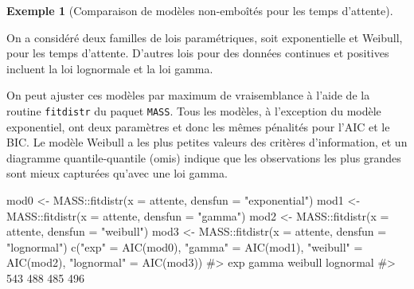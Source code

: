 \documentclass[
  11pt,
  letterpaper,
]{scrbook}
\newenvironment{Shaded}{\begin{snugshade}}{\end{snugshade}}
\newcommand{\AttributeTok}[1]{\textcolor[rgb]{0.40,0.45,0.13}{#1}}
\newcommand{\CommentTok}[1]{\textcolor[rgb]{0.37,0.37,0.37}{#1}}
\newcommand{\FunctionTok}[1]{\textcolor[rgb]{0.28,0.35,0.67}{#1}}
\newcommand{\NormalTok}[1]{\textcolor[rgb]{0.00,0.23,0.31}{#1}}
\newcommand{\OtherTok}[1]{\textcolor[rgb]{0.00,0.23,0.31}{#1}}
\newcommand{\SpecialCharTok}[1]{\textcolor[rgb]{0.37,0.37,0.37}{#1}}
\newcommand{\StringTok}[1]{\textcolor[rgb]{0.13,0.47,0.30}{#1}}
\theoremstyle{definition}
\theoremstyle{plain}
\theoremstyle{definition}
\newtheorem{example}{Exemple}[chapter]
\theoremstyle{plain}
\theoremstyle{remark}
\begin{document}
\begin{example}[Comparaison de modèles non-emboîtés pour les temps
d'attente]\protect\hypertarget{exm-aic}{}\label{exm-aic}

On a considéré deux familles de lois paramétriques, soit exponentielle
et Weibull, pour les temps d'attente. D'autres lois pour des données
continues et positives incluent la loi lognormale et la loi gamma.

On peut ajuster ces modèles par maximum de vraisemblance à l'aide de la
routine \texttt{fitdistr} du paquet \texttt{MASS}. Tous les modèles, à
l'exception du modèle exponentiel, ont deux paramètres et donc les mêmes
pénalités pour l'AIC et le BIC. Le modèle Weibull a les plus petites
valeurs des critères d'information, et un diagramme quantile-quantile
(omis) indique que les observations les plus grandes sont mieux
capturées qu'avec une loi gamma.

\begin{Shaded}
\begin{Highlighting}[]
\NormalTok{mod0 }\OtherTok{\textless{}{-}}\NormalTok{ MASS}\SpecialCharTok{::}\FunctionTok{fitdistr}\NormalTok{(}\AttributeTok{x =}\NormalTok{ attente, }\AttributeTok{densfun =} \StringTok{"exponential"}\NormalTok{)}
\NormalTok{mod1 }\OtherTok{\textless{}{-}}\NormalTok{ MASS}\SpecialCharTok{::}\FunctionTok{fitdistr}\NormalTok{(}\AttributeTok{x =}\NormalTok{ attente, }\AttributeTok{densfun =} \StringTok{"gamma"}\NormalTok{)}
\NormalTok{mod2 }\OtherTok{\textless{}{-}}\NormalTok{ MASS}\SpecialCharTok{::}\FunctionTok{fitdistr}\NormalTok{(}\AttributeTok{x =}\NormalTok{ attente, }\AttributeTok{densfun =} \StringTok{"weibull"}\NormalTok{)}
\NormalTok{mod3 }\OtherTok{\textless{}{-}}\NormalTok{ MASS}\SpecialCharTok{::}\FunctionTok{fitdistr}\NormalTok{(}\AttributeTok{x =}\NormalTok{ attente, }\AttributeTok{densfun =} \StringTok{"lognormal"}\NormalTok{)}
\FunctionTok{c}\NormalTok{(}\StringTok{"exp"} \OtherTok{=} \FunctionTok{AIC}\NormalTok{(mod0), }
  \StringTok{"gamma"} \OtherTok{=} \FunctionTok{AIC}\NormalTok{(mod1), }
  \StringTok{"weibull"} \OtherTok{=} \FunctionTok{AIC}\NormalTok{(mod2),}
  \StringTok{"lognormal"} \OtherTok{=} \FunctionTok{AIC}\NormalTok{(mod3))}
\CommentTok{\#\textgreater{}       exp     gamma   weibull lognormal }
\CommentTok{\#\textgreater{}       543       488       485       496}
\end{Highlighting}
\end{Shaded}

\end{example}
\end{document}
